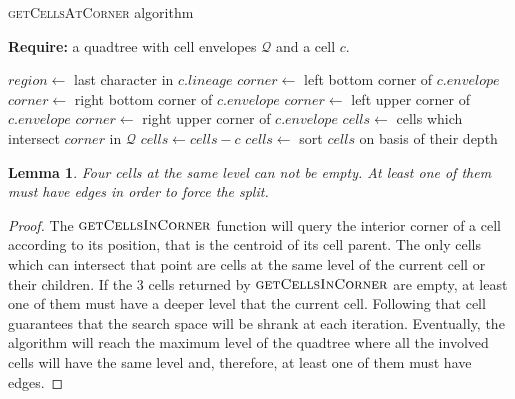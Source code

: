 \documentclass{article}
\newtheorem*{lemma}{Lemma}
\begin{document}
    \begin{algorithm} \caption{\textsc{getCellsAtCorner} algorithm}
        \textbf{Require:} a quadtree with cell envelopes $\mathcal Q$ and a cell $c$.
        \begin{algorithmic}[1]
            \State $region \gets $ last character in $c.lineage$
                    \State $corner \gets$ left bottom corner of $c.envelope$
                \EndCase
                    \State $corner \gets$ right bottom corner of $c.envelope$
                \EndCase
                    \State $corner \gets$ left upper corner of $c.envelope$
                \EndCase
                    \State $corner \gets$ right upper corner of $c.envelope$
                \EndCase
            \EndSwitch
            \State $cells \gets$ cells which intersect $corner$ in $\mathcal Q$
            \State $cells \gets cells - c$ 
            \State $cells \gets$ sort $cells$ on basis of their depth 
            \State {}
        \EndFunction
        \end{algorithmic}
    \end{algorithm}
    
    \begin{lemma}
    Four cells at the same level can not be empty.  At least one of them must have edges in order to force the split.
    \end{lemma}
    
    \begin{proof}
    The $\textsc{getCellsInCorner}$ function will query the interior corner of a cell according to its position, that is the centroid of its cell parent.  The only cells which can intersect that point are cells at the same level of the current cell or their children.  If the 3 cells returned by $\textsc{getCellsInCorner}$ are empty, at least one of them must have a deeper level that the current cell.  Following that cell guarantees that the search space will be shrank at each iteration.  Eventually, the algorithm will reach the maximum level of the quadtree where all the involved cells will have the same level and, therefore, at least one of them must have edges.
    \end{proof}
    
\end{document}
